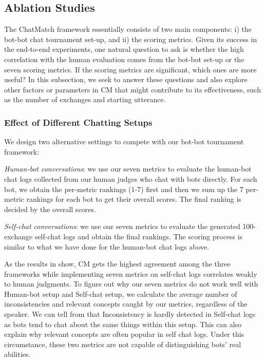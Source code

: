 

\subsection{Ablation Studies}
\label{sec:ablation}
The ChatMatch framework essentially consists of two main components: i) the 
bot-bot chat tournament set-up, and ii) the scoring metrics. 
Given its success in the end-to-end experiments,
one natural question to ask is whether the high correlation with the human
evaluation comes from the bot-bot set-up or the seven scoring metrics.
If the scoring metrics are significant, which ones are more useful?
In this subsection, we seek to answer these questions 
and also explore other factors or parameters in
CM that might contribute to its effectiveness, 
such as the number of exchanges 
and starting utterance.


\subsubsection{Effect of Different Chatting Setups}
We design two alternative settings to compete with our bot-bot tournament 
framework:

\noindent
\textit{Human-bot conversations}: we use our seven metrics to evaluate
the human-bot chat logs
collected 
from our human judges who
chat with bots directly. 
For each bot, we obtain the per-metric rankings (1-7) 
first and then we sum up the 7 per-metric rankings
for each bot
 to get their overall scores.
The final ranking is decided by the overall scores.

\noindent
\textit{Self-chat conversations}: 
we use our seven metrics to evaluate
the generated
 100-exchange self-chat logs 
and obtain the final rankings. 
The scoring process is similar 
to what we have done for the human-bot chat logs above.

As the results in  show, CM gets the highest agreement
 among the three frameworks while
implementing seven metrics 
on self-chat logs 
correlates weakly
to human judgments.
To figure out why our seven metrics do not 
work well with Human-bot setup and Self-chat setup, 
we calculate the average number of inconsistencies and relevant concepts
caught by our metrics, regardless of the speaker.
 We can tell from  that
Inconsistency is hardly
detected in Self-chat logs
as bots tend to chat about the same things
within this setup.
This can also explain why relevant 
concepts are often popular in self chat logs.
Under this 
circumstance, 
these two metrics are not 
capable of distinguishing bots' real
abilities.
 
